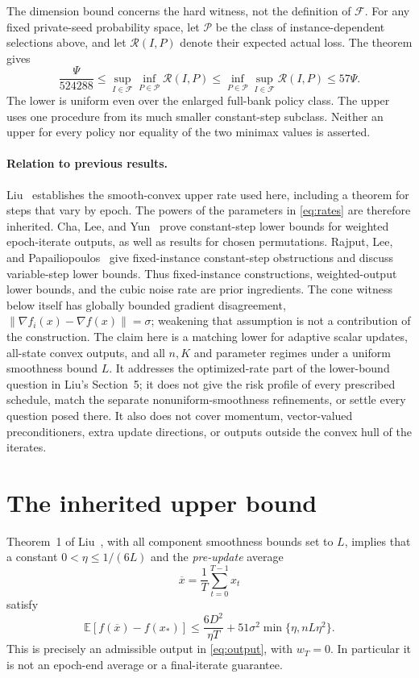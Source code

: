 \documentclass[11pt]{article}
\theoremstyle{remark}
\newcommand{\E}{\mathbb E}
\newcommand{\norm}[1]{\lVert #1\rVert}
\newcommand{\Risk}{\mathcal R}
\newcommand{\Class}{\mathcal F}
\newcommand{\Pol}{\mathcal P}
\begin{document}
The dimension bound concerns the hard witness, not the definition of
$\Class$. For any fixed private-seed probability space, let $\Pol$
be the class of instance-dependent selections above, and let
$\Risk(I,P)$ denote their expected actual loss. The theorem gives
\begin{equation}\label{eq:minimax}
 \frac{\Psi}{524288}
 \le\sup_{I\in\Class}\inf_{P\in\Pol}\Risk(I,P)
 \le\inf_{P\in\Pol}\sup_{I\in\Class}\Risk(I,P)
 \le57\Psi.
\end{equation}
The lower is uniform even over the enlarged full-bank policy class.
The upper uses one procedure from its much smaller constant-step
subclass. Neither an upper for every policy nor equality of the two
minimax values is asserted.

\paragraph{Relation to previous results.}
Liu~\cite{liu2026} establishes the smooth-convex upper rate used here,
including a theorem for steps that vary by epoch. The powers of the
parameters in \eqref{eq:rates} are therefore inherited. Cha, Lee, and
Yun~\cite{cha2023} prove constant-step lower bounds for weighted
epoch-iterate outputs, as well as results for chosen permutations.
Rajput, Lee, and Papailiopoulos~\cite{rajput2022} give fixed-instance
constant-step obstructions and discuss variable-step lower bounds.
Thus fixed-instance constructions, weighted-output lower bounds, and
the cubic noise rate are prior ingredients. The cone witness below
itself has globally bounded gradient disagreement,
$\norm{\nabla f_i(x)-\nabla f(x)}=\sigma$; weakening that assumption
is not a contribution of the construction. The claim here is a
matching lower for adaptive scalar updates, all-state convex outputs,
and all $n,K$ and parameter regimes under a uniform smoothness bound
$L$. It addresses the optimized-rate part of the lower-bound question
in Liu's Section~5; it does not give the risk profile of every
prescribed schedule, match the separate nonuniform-smoothness
refinements, or settle every question posed there. It also does not
cover momentum, vector-valued
preconditioners, extra update directions, or outputs outside the convex
hull of the iterates.

\section{The inherited upper bound}

Theorem~1 of Liu~\cite{liu2026}, with all component smoothness bounds
set to $L$, implies that a constant $0<\eta\le1/(6L)$ and the
\emph{pre-update} average
\begin{equation}\label{eq:preaverage}
 \overline x=\frac1T\sum_{t=0}^{T-1}x_t
\end{equation}
satisfy
\begin{equation}\label{eq:liu}
 \E[f(\overline x)-f(x_*)]
 \le\frac{6D^2}{\eta T}
       +51\sigma^2\min\{\eta,nL\eta^2\}.
\end{equation}
This is precisely an admissible output in \eqref{eq:output}, with
$w_T=0$. In particular it is not an epoch-end average or a final-iterate
guarantee.
\end{document}

